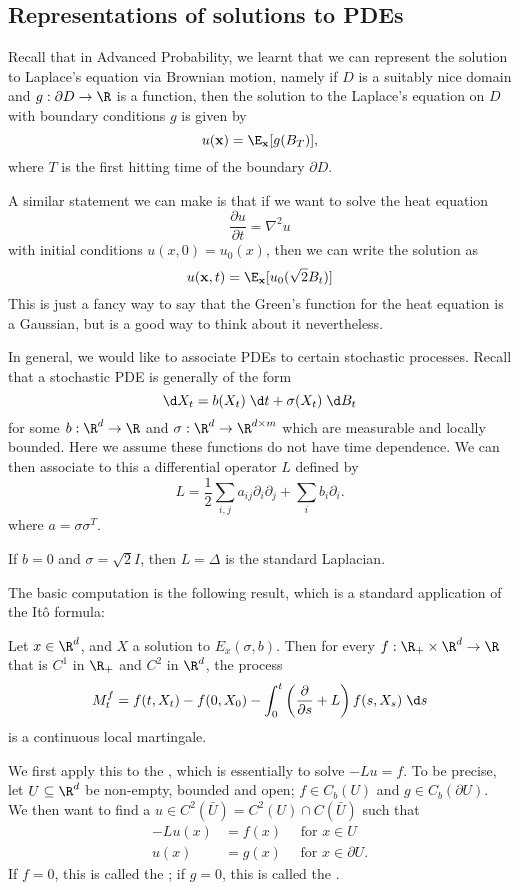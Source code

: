 \documentclass[a4paper]{article}
\begin{document}
\subsection{Representations of solutions to PDEs}
Recall that in Advanced Probability, we learnt that we can represent the solution to Laplace's equation via Brownian motion, namely if $D$ is a suitably nice domain and $g: \partial D \to \R$ is a function, then the solution to the Laplace's equation on $D$ with boundary conditions $g$ is given by
\[
  u(\mathbf{x}) = \E_{\mathbf{x}}[g(B_T)],
\]
where $T$ is the first hitting time of the boundary $\partial D$.

A similar statement we can make is that if we want to solve the heat equation
\[
  \frac{\partial u}{\partial t} = \nabla^2 u
\]
with initial conditions $u(x, 0) = u_0(x)$, then we can write the solution as
\[
  u(\mathbf{x}, t) = \E_\mathbf{x}[u_0(\sqrt{2} B_t)]
\]
This is just a fancy way to say that the Green's function for the heat equation is a Gaussian, but is a good way to think about it nevertheless.

In general, we would like to associate PDEs to certain stochastic processes. Recall that a stochastic PDE is generally of the form
\[
  \d X_t = b(X_t)\;\d t + \sigma(X_t)\;\d B_t
\]
for some $b: \R^d \to \R$ and $\sigma: \R^d \to \R^{d \times m}$ which are measurable and locally bounded. Here we assume these functions do not have time dependence. We can then associate to this a differential operator $L$ defined by
\[
  L = \frac{1}{2} \sum_{i, j} a_{ij} \partial_i \partial_j + \sum_i  b_i \partial_i.
\]
where $a = \sigma \sigma^T$.

\begin{eg}
  If $b = 0$ and $\sigma = \sqrt{2} I$, then $L = \Delta$ is the standard Laplacian.
\end{eg}

The basic computation is the following result, which is a standard application of the It\^o formula:
\begin{prop}
  Let $x \in \R^d$, and $X$ a solution to $E_x(\sigma, b)$. Then for every $f: \R_+ \times \R^d \to \R$ that is $C^1$ in $\R_+$ and $C^2$ in $\R^d$, the process
  \[
    M_t^f = f(t, X_t) - f(0, X_0) - \int_0^t \left(\frac{\partial}{\partial s} + L\right)f(s, X_s)\;\d s
  \]
  is a continuous local martingale.\fakeqed
\end{prop}

We first apply this to the , which is essentially to solve $-Lu = f$. To be precise, let $U \subseteq \R^d$ be non-empty, bounded and open; $f \in C_b(U)$ and $g \in C_b(\partial U)$. We then want to find a $u \in C^2(\bar{U}) = C^2(U) \cap C(\bar{U})$ such that
\begin{align*}
  -Lu(x) &= f(x)\quad\text{ for } x \in U\\
  u(x) &= g(x)\quad\text{ for } x \in \partial U.
\end{align*}
If $f = 0$, this is called the ; if $g = 0$, this is called the .
\end{document}
